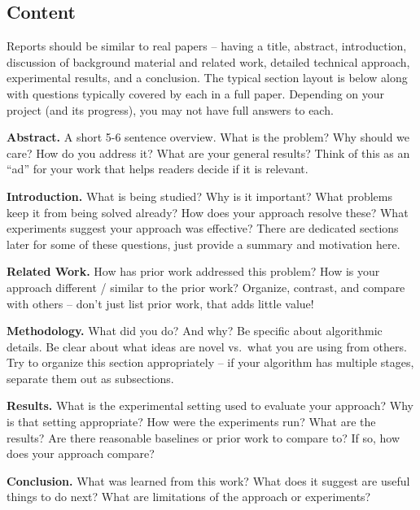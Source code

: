 \documentclass[10pt,twocolumn,letterpaper]{article}
\begin{document}
\subsection{Content} 
Reports should be similar to real papers -- having a title, abstract, introduction, discussion of background material and related work, detailed technical approach, experimental results, and a conclusion. The typical section layout is below along with questions typically covered by each in a full paper. Depending on your project (and its progress), you may not have full answers to each.\\[-5pt]
\begin{compactenum}[1)]
    \item \textbf{Abstract.} A short 5-6 sentence overview. What is the problem? Why should we care? How do you address it? What are your general results? Think of this as an ``ad'' for your work that helps readers decide if it is relevant.\\
    
    \item \textbf{Introduction.} What is being studied? Why is it important? What problems keep it from being solved already? How does your approach resolve these? What experiments suggest your approach was effective? There are dedicated sections later for some of these questions, just    provide a summary and motivation here. \\
    
    \item \textbf{Related Work.} How has prior work addressed this problem? How is your approach different / similar to the prior work? Organize, contrast, and compare with others -- don't just list prior work, that adds little value! \\
    
    \item \textbf{Methodology.} What did you do? And why? Be specific about algorithmic details. Be clear about what ideas are novel vs.~what you are using from others. Try to organize this section appropriately -- if your algorithm has multiple stages, separate them out as subsections.  \\
    
    \item \textbf{Results.} What is the experimental setting used to evaluate your approach? Why is that setting appropriate? How were the experiments run? What are the results? Are there reasonable baselines or prior work to compare to? If so, how does your approach compare? \\
    
    \item \textbf{Conclusion.} What was learned from this work? What does it suggest are useful things to do next? What are limitations of the approach or experiments?\\
\end{compactenum}
\end{document}
